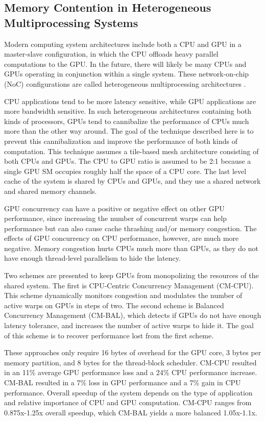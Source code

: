 \documentclass[prodmode,acmtecs]{acmsmall} %
\begin{document}
\subsection{Memory Contention in Heterogeneous Multiprocessing Systems}
Modern computing system architectures include both a CPU and GPU in a
master-slave configuration, in which the CPU offloads heavy parallel
computations to the GPU. In the future, there will likely be many CPUs and GPUs
operating in conjunction within a single system. These network-on-chip (NoC)
configurations are called heterogeneous multiprocessing architectures
\cite{ManagingConcurrencyInHeterogeneous}.

CPU applications tend to be more latency sensitive, while GPU applications are
more bandwidth sensitive. In such heterogeneous architectures containing both
kinds of processors, GPUs tend to cannibalize the performance of CPUs much more
than the other way around. The goal of the technique described here is to
prevent this cannibalization and improve the performance of both kinds of
computation. This technique assumes a tile-based mesh architecture consisting of
both CPUs and GPUs. The CPU to GPU ratio is assumed to be 2:1 because a single
GPU SM occupies roughly half the space of a CPU core. The last level cache of
the system is shared by CPUs and GPUs, and they use a shared network and shared
memory channels.

GPU concurrency can have a positive or negative effect on other GPU performance,
since increasing the number of concurrent warps can help performance but can
also cause cache thrashing and/or memory congestion. The effects of GPU
concurrency on CPU performance, however, are much more negative. Memory
congestion hurts CPUs much more than GPUs, as they do not have enough
thread-level parallelism to hide the latency.

Two schemes are presented to keep GPUs from monopolizing the resources of the
shared system. The first is CPU-Centric Concurrency Management (CM-CPU). This
scheme dynamically monitors congestion and modulates the number of active warps
on GPUs in steps of two. The second scheme is Balanced Concurrency Management
(CM-BAL), which detects if GPUs do not have enough latency tolerance, and
increases the number of active warps to hide it. The goal of this scheme is to
recover performance lost from the first scheme.

These approaches only require 16 bytes of overhead for the GPU core, 3 bytes per
memory partition, and 8 bytes for the thread-block scheduler. CM-CPU resulted in
an 11\% average GPU performance loss and a 24\% CPU performance increase. CM-BAL
resulted in a 7\% loss in GPU performance and a 7\% gain in CPU performance.
Overall speedup of the system depends on the type of application and relative
importance of CPU and GPU computation. CM-CPU ranges from 0.875x-1.25x overall
speedup, which CM-BAL yields a more balanced 1.05x-1.1x.
\end{document}
